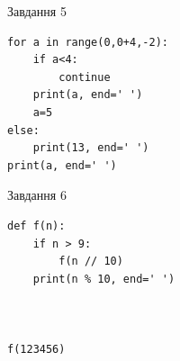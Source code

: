 \documentclass[12pt, ukrainian]{article}
\begin{document}
{\vspace{15mm}
\begin{minipage}[t]{9.7cm}                
{\begin{center}Завдання {5}\end{center}}
\begin{verbatim}
for a in range(0,0+4,-2):
    if a<4:
        continue
    print(a, end=' ')
    a=5
else:
    print(13, end=' ')
print(a, end=' ')
\end{verbatim}     
\end{minipage}
\vline \hspace{8mm}
\begin{minipage}[t]{8.0cm}                
{\begin{center}Завдання {6}\end{center}}
\begin{verbatim}
def f(n):
    if n > 9:
        f(n // 10)
    print(n % 10, end=' ')
    


f(123456)
\end{verbatim}     
\end{minipage}

}
\newpage
\end{document}
